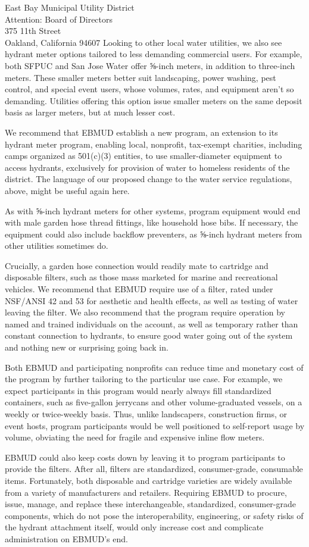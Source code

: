 \documentclass[letterpaper]{letter}
\begin{document}
\begin{letter}{%
    East Bay Municipal Utility District\\
    Attention: Board of Directors\\
    375 11th Street\\
    Oakland, California 94607}
    Looking to other local water utilities, we also see hydrant meter options tailored to less demanding commercial users. For example, both SFPUC and San Jose Water offer ⅝-inch meters, in addition to three-inch meters. These smaller meters better suit landscaping, power washing, pest control, and special event users, whose volumes, rates, and equipment aren’t so demanding. Utilities offering this option issue smaller meters on the same deposit basis as larger meters, but at much lesser cost.

    We recommend that EBMUD establish a new program, an extension to its hydrant meter program, enabling local, nonprofit, tax-exempt charities, including camps organized as 501(c)(3) entities, to use smaller-diameter equipment to access hydrants, exclusively for provision of water to homeless residents of the district. The language of our proposed change to the water service regulations, above, might be useful again here.

    As with ⅝-inch hydrant meters for other systems, program equipment would end with male garden hose thread fittings, like household hose bibs. If necessary, the equipment could also include backflow preventers, as ⅝-inch hydrant meters from other utilities sometimes do.

    Crucially, a garden hose connection would readily mate to cartridge and disposable filters, such as those mass marketed for marine and recreational vehicles. We recommend that EBMUD require use of a filter, rated under NSF/ANSI 42 and 53 for aesthetic and health effects, as well as testing of water leaving the filter. We also recommend that the program require operation by named and trained individuals on the account, as well as temporary rather than constant connection to hydrants, to ensure good water going out of the system and nothing new or surprising going back in.

    Both EBMUD and participating nonprofits can reduce time and monetary cost of the program by further tailoring to the particular use case. For example, we expect participants in this program would nearly always fill standardized containers, such as five-gallon jerrycans and other volume-graduated vessels, on a weekly or twice-weekly basis. Thus, unlike landscapers, construction firms, or event hosts, program participants would be well positioned to self-report usage by volume, obviating the need for fragile and expensive inline flow meters.

    EBMUD could also keep costs down by leaving it to program participants to provide the filters. After all, filters are standardized, consumer-grade, consumable items. Fortunately, both disposable and cartridge varieties are widely available from a variety of manufacturers and retailers. Requiring EBMUD to procure, issue, manage, and replace these interchangeable, standardized, consumer-grade components, which do not pose the interoperability, engineering, or safety risks of the hydrant attachment itself, would only increase cost and complicate administration on EBMUD’s end.


\end{letter}
\end{document}
